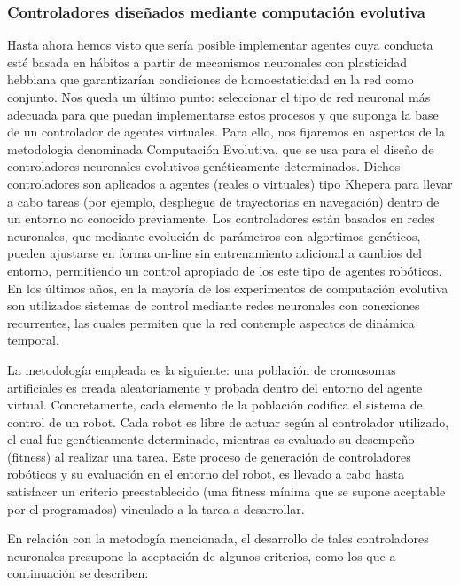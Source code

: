 \subsubsection{Controladores diseñados mediante computación evolutiva}
Hasta ahora hemos visto que sería posible implementar agentes cuya conducta esté basada en hábitos a partir de mecanismos neuronales con plasticidad hebbiana que garantizarían condiciones de homoestaticidad en la red como conjunto. Nos queda un último punto: seleccionar el tipo de red neuronal más adecuada para que puedan implementarse estos procesos y que suponga la base de un controlador de agentes virtuales. Para ello, nos fijaremos en aspectos de la metodología denominada Computación Evolutiva, que se usa para el diseño de controladores neuronales evolutivos genéticamente determinados. Dichos controladores son aplicados a agentes (reales o virtuales) tipo Khepera para llevar a cabo tareas (por ejemplo, despliegue de trayectorias en navegación) dentro de un entorno no conocido previamente. Los controladores están basados en redes neuronales, que mediante evolución de parámetros con algortimos genéticos, pueden ajustarse en forma on-line sin entrenamiento adicional a cambios del entorno, permitiendo un control apropiado de los este tipo de agentes robóticos. En los últimos años, en la mayoría de los experimentos de computación evolutiva son utilizados sistemas de control mediante redes neuronales con conexiones recurrentes, las cuales permiten que la red contemple aspectos de dinámica temporal\cite{JesperDario}.

La metodología empleada es la siguiente: una población de cromosomas artificiales es creada aleatoriamente y probada dentro del entorno del agente virtual. Concretamente, cada elemento de la población codifica el sistema de control de un robot. Cada robot es libre de actuar según al controlador utilizado, el cual fue genéticamente determinado, mientras es evaluado su desempeño (fitness) al realizar una tarea. Este proceso de generación de controladores robóticos y su evaluación en el entorno del robot, es llevado a cabo hasta satisfacer un criterio preestablecido (una fitness mínima que se supone aceptable por el programados) vinculado a la tarea a desarrollar.

En relación con la metodogía mencionada, el desarrollo de tales controladores neuronales presupone la aceptación de algunos criterios, como los que a continuación se describen:

